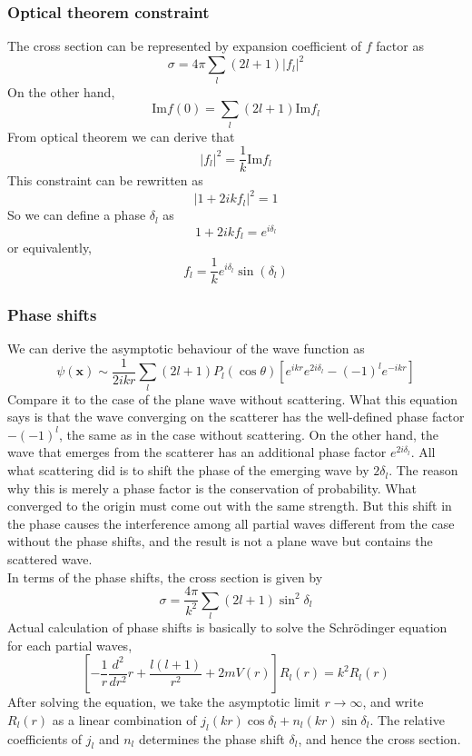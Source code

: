 \documentclass[cyan]{elegantnote}
\begin{document}
\subsubsection{Optical theorem constraint}
\noindent
The cross section can be represented by expansion coefficient of $f$ factor as
\[\sigma = 4\pi \sum_l (2l+1)|f_l|^2\]
On the other hand, 
\[\mathrm{Im} f(0) = \sum_l (2l+1) \mathrm{Im} f_l\]
From optical theorem we can derive that
\[|f_l|^2 = \frac{1}{k} \mathrm{Im} f_l\]
This constraint can be rewritten as
\[|1+2ikf_l|^2 = 1\]
So we can define a phase $\delta_l$ as 
\[1+2ikf_l = e^{i\delta_l}\]
or equivalently,
\[f_l = \frac{1}{k} e^{i\delta_l} \sin(\delta_l)\]

\subsubsection{Phase shifts}
\noindent
We can derive the asymptotic behaviour of the wave function as
\[\psi(\mathbf{x}) \sim \frac{1}{2ikr} \sum_{l} (2l+1)P_l(\cos \theta) [e^{ikr}e^{2i\delta_l} - (-1)^l e^{-ikr}]\]
Compare it to the case of the plane wave without scattering. What this equation says is that the wave converging on the scatterer
has the well-defined phase factor $-(-1)^l$, the same as in the case without scattering. On the other hand, the wave that emerges from the scatterer has an additional phase factor $e^{2i\delta_l}$. All what scattering did is to shift the phase of the emerging wave by $2\delta_l$. The reason why this is merely a phase factor is
the conservation of probability. What converged to the origin must come out with the same strength. But this shift in the phase causes the interference among all partial waves different from the case without the phase shifts, and the result is not a plane wave but contains the scattered wave.\\
In terms of the phase shifts, the cross section is given by
\[\sigma = \frac{4\pi}{k^2} \sum_l (2l+1) \sin^2\delta_l\]
Actual calculation of phase shifts is basically to solve the Schr\"{o}dinger equation for each partial waves,
\[\left[-\frac{1}{r}\frac{d^2}{dr^2}r+\frac{l(l+1)}{r^2}+2mV(r)\right]R_l(r) = k^2 R_l(r)\]
After solving the equation, we take the asymptotic limit $r \to \infty$, and write $R_l(r)$ as a linear combination of $j_l(kr)\cos \delta_l + n_l(kr) \sin \delta_l $. The relative coefficients of $j_l$ and $n_l$ determines the phase shift $\delta_l$, and hence the cross section.
\end{document}
